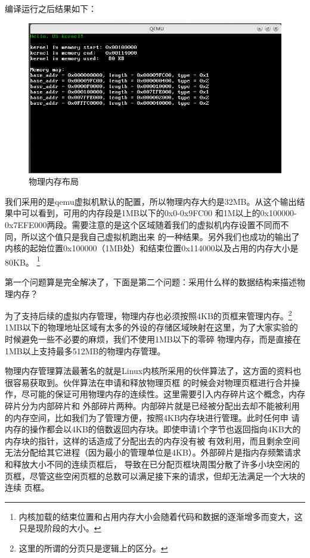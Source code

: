 \par 编译运行之后结果如下：

\begin{figure}[H]
      \centering
      \includegraphics[scale=0.6]{picture/chapt9/PHY_MEM_MAP.png}
      \caption{物理内存布局}
\end{figure}

\par 我们采用的是qemu虚拟机默认的配置，所以物理内存大约是32MB。从这个输出结果中可以看到，可用的内存段是1MB以下的0x0-0x9FC00\allowbreak
和1M以上的0x100000-0x7EFE000两段。需要注意的是这个区域随着我们的虚拟机内存设置不同而不同，所以这个值只是我自己虚拟机跑出来\allowbreak
的一种结果。另外我们也成功的输出了内核的起始位置0x100000（1MB处）和结束位置0x114000以及占用的内存大小是80KB。\allowbreak
\footnote{内核加载的结束位置和占用内存大小会随着代码和数据的逐渐增多而变大，这只是现阶段的大小。}

\par 第一个问题算是完全解决了，下面是第二个问题：采用什么样的数据结构来描述物理内存？

\par 为了支持后续的虚拟内存管理，物理内存也必须按照4KB的页框来管理内存。\footnote{这里的所谓的分页只是逻辑上的区分。}\allowbreak
1MB以下的物理地址区域有太多的外设的存储区域映射在这里，为了大家实验的时候避免一些不必要的麻烦，我们不使用1MB以下的零碎\allowbreak
物理内存，而是直接在1MB以上支持最多512MB的物理内存管理。

\par 物理内存管理算法最著名的就是Linux内核所采用的伙伴算法了，这方面的资料也很容易获取到。伙伴算法在申请和释放物理页框\allowbreak
的时候会对物理页框进行合并操作，尽可能的保证可用物理内存的连续性。这里需要引入内存碎片这个概念，内存碎片分为内部碎片和\allowbreak
外部碎片两种。内部碎片就是已经被分配出去却不能被利用的内存空间，比如我们为了管理方便，按照4KB内存块进行管理。此时任何申\allowbreak
请内存的操作都会以4KB的倍数返回内存块。即使申请1个字节也返回指向4KB大的内存块的指针，这样的话造成了分配出去的内存没有被\allowbreak
有效利用，而且剩余空间无法分配给其它进程（因为最小的管理单位是4KB）。外部碎片是指内存频繁请求和释放大小不同的连续页框后，\allowbreak
导致在已分配页框块周围分散了许多小块空闲的页框，尽管这些空闲页框的总数可以满足接下来的请求，但却无法满足一个大块的连续\allowbreak
页框。

